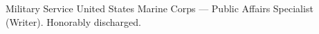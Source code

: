 \documentclass{resume}
\begin{document}

\begin{rSection}{Military Service}
United States Marine Corps --- Public Affairs Specialist (Writer). Honorably discharged.
\end{rSection}
\end{document}
